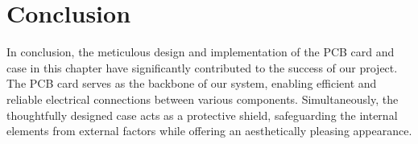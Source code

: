 \section{Conclusion}
In conclusion, the meticulous design and implementation of the PCB card and case in this chapter have significantly contributed to the success of our project. The PCB card serves as the backbone of our system, enabling efficient and reliable electrical connections between various components. Simultaneously, the thoughtfully designed case acts as a protective shield, safeguarding the internal elements from external factors while offering an aesthetically pleasing appearance.
%

